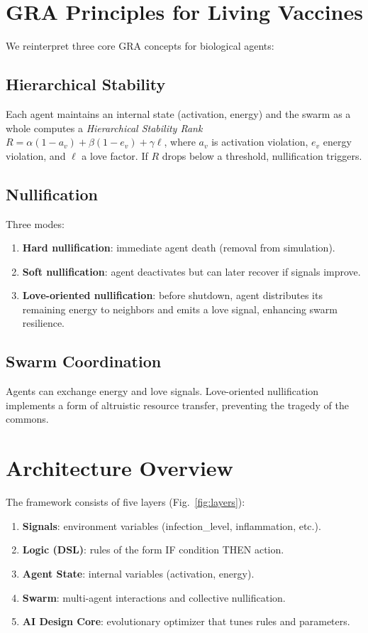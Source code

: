 \documentclass[12pt,a4paper]{article}
\begin{document}
\section{GRA Principles for Living Vaccines}
We reinterpret three core GRA concepts for biological agents:

\subsection{Hierarchical Stability}
Each agent maintains an internal state (activation, energy) and the swarm as a whole computes a \textit{Hierarchical Stability Rank} $ R = \alpha (1 - a_v) + \beta (1 - e_v) + \gamma \ell $, where $ a_v $ is activation violation, $ e_v $ energy violation, and $ \ell $ a love factor. If $ R $ drops below a threshold, nullification triggers.

\subsection{Nullification}
Three modes:
\begin{enumerate}
    \item \textbf{Hard nullification}: immediate agent death (removal from simulation).
    \item \textbf{Soft nullification}: agent deactivates but can later recover if signals improve.
    \item \textbf{Love-oriented nullification}: before shutdown, agent distributes its remaining energy to neighbors and emits a love signal, enhancing swarm resilience.
\end{enumerate}

\subsection{Swarm Coordination}
Agents can exchange energy and love signals. Love-oriented nullification implements a form of altruistic resource transfer, preventing the tragedy of the commons.

\section{Architecture Overview}
The framework consists of five layers (Fig.~\ref{fig:layers}):
\begin{enumerate}
    \item \textbf{Signals}: environment variables (infection\_level, inflammation, etc.).
    \item \textbf{Logic (DSL)}: rules of the form IF condition THEN action.
    \item \textbf{Agent State}: internal variables (activation, energy).
    \item \textbf{Swarm}: multi-agent interactions and collective nullification.
    \item \textbf{AI Design Core}: evolutionary optimizer that tunes rules and parameters.
\end{enumerate}
\end{document}
